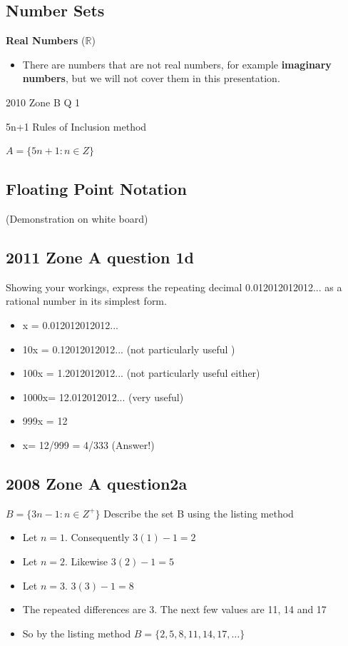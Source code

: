 \documentclass[]{report}
\begin{document}
\subsection{Number Sets}

\textbf{Real Numbers} ($\mathbb{R}$)
\begin{itemize}
\item There are numbers that are not real numbers, for example \textbf{imaginary numbers}, but we will not cover them in this presentation.
\end{itemize}

   
2010 Zone B Q 1

5n+1 Rules of Inclusion method

$A = \{5n+1: n \in Z \}$
\subsection*{Floating Point Notation}
(Demonstration on white board)

\subsection*{2011 Zone A question 1d}

Showing your workings, express the repeating decimal 0.012012012012...
as a rational number in its simplest form.


\begin{itemize}
\item x = 0.012012012012...
\item 10x = 0.12012012012... (not particularly useful )
\item 100x = 1.2012012012... (not particularly useful either)
\item 1000x= 12.012012012... (very useful)
\item 999x = 12
\item x= 12/999 = 4/333 (Answer!)
\end{itemize}


\subsection*{2008  Zone A question2a}
$B = \{3n-1 :n \in Z^{+} \}$
Describe the set B using the listing method

\begin{itemize}
	\item Let $n=1$. Consequently $3(1)-1 =2$
	\item Let $n=2$. Likewise $3(2)-1 =5$
	\item Let $n=3$. $3(3)-1 = 8 $
	\item The repeated differences are 3. The next few values are 11, 14 and 17
	\item So by the listing method $B= \{2,5,8,11,14,17,\ldots\}$
\end{itemize}
\end{document}
